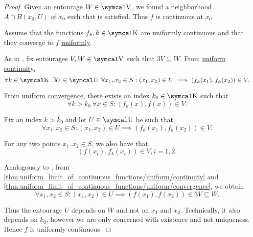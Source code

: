 \begin{proof}
  Given an entourage \( W \in \CV \), we found a neighborhood \( A \cap B(x_0, U) \) of \( x_0 \) such that  is satisfied. Thus \( f \) is continuous at \( x_0 \).

   Assume that the functions \( f_k, k \in \CK \) are uniformly continuous and that they converge to \( f \) \hyperref[def:function_net_convergence/locally_uniform]{uniformly}.

  As in , fix entourages \( V, W \in \CV \) such that \( 3V \subseteq W \). From \hyperref[def:uniform_continuity]{uniform continuity},
  \begin{equation*}
    \forall k \in \CK \ \exists U \in \CU \ \forall x_1, x_2 \in S : (x_1, x_2) \in U \implies (f_k(x_1), f_k(x_2)) \in V.
  \end{equation*}

  From \hyperref[def:function_net_convergence]{uniform convergence}, there exists an index \( k_0 \in \CK \) such that
  \begin{equation*}
    \forall k > k_0 \ \forall x \in S : (f_k(x), f(x)) \in V.
  \end{equation*}

  Fix an index \( k > k_0 \) and let \( U \in \CU \) be such that
  \begin{equation}\label{thm:uniform_limit_of_continuous_functions/uniform/continuity}
    \forall x_1, x_2 \in S : (x_1, x_2) \in U \implies (f_k(x_1), f_k(x_2)) \in V.
  \end{equation}

  For any two points \( x_1, x_2 \in S \), we also have that
  \begin{equation}\label{thm:uniform_limit_of_continuous_functions/uniform/convergence}
    (f(x_i), f_k(x_i)) \in V, i = 1, 2.
  \end{equation}

  Analogously to , from \eqref{thm:uniform_limit_of_continuous_functions/uniform/continuity} and \eqref{thm:uniform_limit_of_continuous_functions/uniform/convergence}, we obtain
  \begin{equation*}
    \forall x_1, x_2 \in S : (x_1, x_2) \in U \implies (f(x_1), f(x_2)) \in 3V \subseteq W.
  \end{equation*}

  Thus the entourage \( U \) depends on \( W \) and not on \( x_1 \) and \( x_2 \). Technically, it also depends on \( k_0 \), however we are only concerned with existence and not uniqueness. Hence \( f \) is uniformly continuous.
\end{proof}

